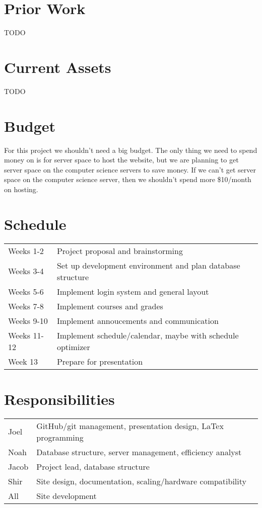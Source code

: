 \documentclass{article}
\begin{document}
\section{Prior Work}

TODO

\section{Current Assets}

TODO

\section{Budget}

For this project we shouldn't need a big budget. The only thing we need to
spend money on is for server space to host the website, but we are planning to
get server space on the computer science servers to save money. If we can't get
server space on the computer science server, then we shouldn't spend more
\$10/month on hosting.

\section{Schedule}

\begin{tabular}{ll}
    Weeks 1-2&Project proposal and brainstorming\\
    Weeks 3-4&Set up development environment and plan database structure\\
    Weeks 5-6&Implement login system and general layout\\
    Weeks 7-8&Implement courses and grades\\
    Weeks 9-10&Implement annoucements and communication\\
    Weeks 11-12&Implement schedule/calendar, maybe with schedule optimizer\\
    Week 13&Prepare for presentation\\
\end{tabular}

\section{Responsibilities}

\begin{tabular}{ll}
    Joel&GitHub/git management, presentation design, LaTex programming\\
    Noah&Database structure, server management, efficiency analyst\\
    Jacob&Project lead, database structure\\
    Shir&Site design, documentation, scaling/hardware compatibility\\
    All&Site development\\
\end{tabular}

\nocite{*}

{}

\end{document}
